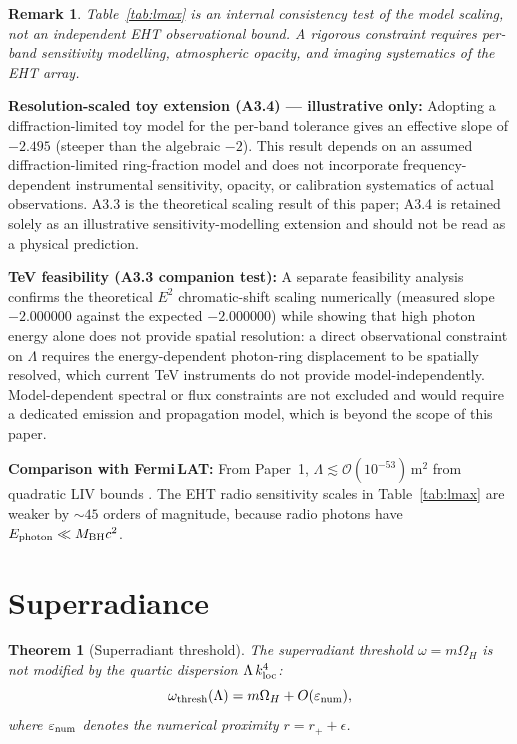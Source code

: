 \documentclass[12pt,a4paper]{article}
\newtheorem{theorem}{Theorem}
\newtheorem{remark}{Remark}
\newcommand{\kloc}{k_{\rm loc}}
\newcommand{\OmH}{\Omega_H}
\begin{document}
\begin{remark}
Table~\ref{tab:lmax} is an internal consistency test of the model
scaling, not an independent EHT observational bound.
A rigorous constraint requires per-band sensitivity modelling,
atmospheric opacity, and imaging systematics of the EHT array.
\end{remark}

\textbf{Resolution-scaled toy extension (A3.4) --- illustrative only:}
Adopting a diffraction-limited toy model for the per-band tolerance
gives an effective slope of $-2.495$ (steeper than the algebraic $-2$).
This result depends on an assumed diffraction-limited ring-fraction
model and does not incorporate frequency-dependent instrumental
sensitivity, opacity, or calibration systematics of actual
observations. A3.3 is the theoretical scaling result of this paper;
A3.4 is retained solely as an illustrative sensitivity-modelling
extension and should not be read as a physical prediction.

\textbf{TeV feasibility (A3.3 companion test):}
A separate feasibility analysis confirms the theoretical $E^2$
chromatic-shift scaling numerically (measured slope $-2.000000$
against the expected $-2.000000$) while showing that high photon
energy alone does not provide spatial resolution: a direct
observational constraint on $\Lambda$ requires the energy-dependent
photon-ring displacement to be spatially resolved, which current
TeV instruments do not provide model-independently. Model-dependent
spectral or flux constraints are not excluded and would require a
dedicated emission and propagation model, which is beyond the scope
of this paper.

\textbf{Comparison with Fermi\,LAT:}
From Paper~1, $\Lambda\lesssim\mathcal{O}(10^{-53})$\,m$^2$
from quadratic LIV bounds \citep{Abdo2009}.
The EHT radio sensitivity scales in Table~\ref{tab:lmax} are weaker by
$\sim45$ orders of magnitude, because radio photons have
$E_{\rm photon}\ll M_{\rm BH}c^2$.

\section{Superradiance}
\label{sec:superrad}

\begin{theorem}[Superradiant threshold]
\label{thm:superrad}
The superradiant threshold $\omega=m\OmH$ is not modified by the
quartic dispersion $\Lambda\,\kloc^4$:
\begin{equation}
  \omega_{\rm thresh}(\Lambda) = m\OmH + O(\varepsilon_{\rm num}),
\end{equation}
where $\varepsilon_{\rm num}$ denotes the numerical proximity
$r=r_++\epsilon$.
\end{theorem}
\end{document}
